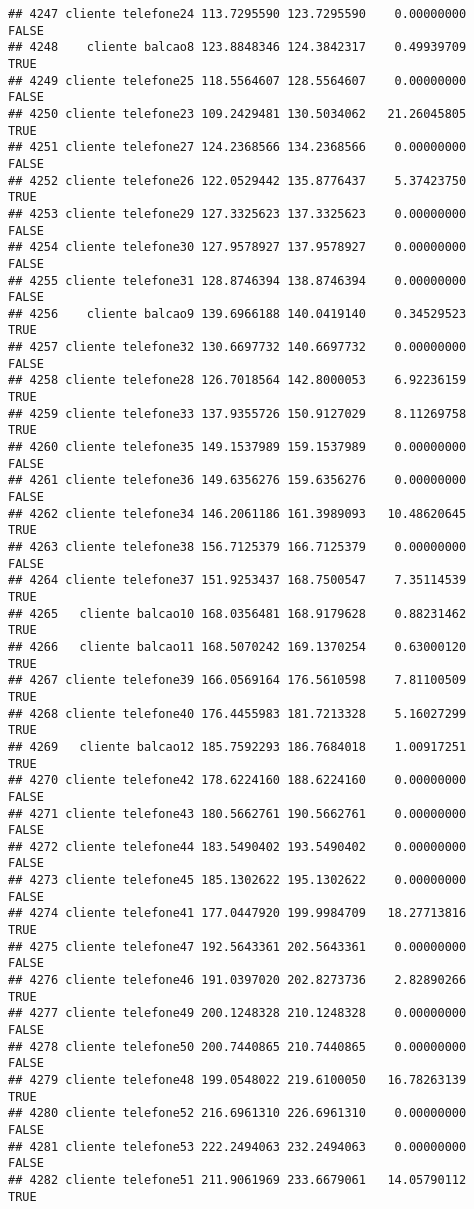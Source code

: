 \documentclass[
]{article}
\begin{document}
\begin{verbatim}
## 4247 cliente telefone24 113.7295590 123.7295590    0.00000000    FALSE
## 4248    cliente balcao8 123.8848346 124.3842317    0.49939709     TRUE
## 4249 cliente telefone25 118.5564607 128.5564607    0.00000000    FALSE
## 4250 cliente telefone23 109.2429481 130.5034062   21.26045805     TRUE
## 4251 cliente telefone27 124.2368566 134.2368566    0.00000000    FALSE
## 4252 cliente telefone26 122.0529442 135.8776437    5.37423750     TRUE
## 4253 cliente telefone29 127.3325623 137.3325623    0.00000000    FALSE
## 4254 cliente telefone30 127.9578927 137.9578927    0.00000000    FALSE
## 4255 cliente telefone31 128.8746394 138.8746394    0.00000000    FALSE
## 4256    cliente balcao9 139.6966188 140.0419140    0.34529523     TRUE
## 4257 cliente telefone32 130.6697732 140.6697732    0.00000000    FALSE
## 4258 cliente telefone28 126.7018564 142.8000053    6.92236159     TRUE
## 4259 cliente telefone33 137.9355726 150.9127029    8.11269758     TRUE
## 4260 cliente telefone35 149.1537989 159.1537989    0.00000000    FALSE
## 4261 cliente telefone36 149.6356276 159.6356276    0.00000000    FALSE
## 4262 cliente telefone34 146.2061186 161.3989093   10.48620645     TRUE
## 4263 cliente telefone38 156.7125379 166.7125379    0.00000000    FALSE
## 4264 cliente telefone37 151.9253437 168.7500547    7.35114539     TRUE
## 4265   cliente balcao10 168.0356481 168.9179628    0.88231462     TRUE
## 4266   cliente balcao11 168.5070242 169.1370254    0.63000120     TRUE
## 4267 cliente telefone39 166.0569164 176.5610598    7.81100509     TRUE
## 4268 cliente telefone40 176.4455983 181.7213328    5.16027299     TRUE
## 4269   cliente balcao12 185.7592293 186.7684018    1.00917251     TRUE
## 4270 cliente telefone42 178.6224160 188.6224160    0.00000000    FALSE
## 4271 cliente telefone43 180.5662761 190.5662761    0.00000000    FALSE
## 4272 cliente telefone44 183.5490402 193.5490402    0.00000000    FALSE
## 4273 cliente telefone45 185.1302622 195.1302622    0.00000000    FALSE
## 4274 cliente telefone41 177.0447920 199.9984709   18.27713816     TRUE
## 4275 cliente telefone47 192.5643361 202.5643361    0.00000000    FALSE
## 4276 cliente telefone46 191.0397020 202.8273736    2.82890266     TRUE
## 4277 cliente telefone49 200.1248328 210.1248328    0.00000000    FALSE
## 4278 cliente telefone50 200.7440865 210.7440865    0.00000000    FALSE
## 4279 cliente telefone48 199.0548022 219.6100050   16.78263139     TRUE
## 4280 cliente telefone52 216.6961310 226.6961310    0.00000000    FALSE
## 4281 cliente telefone53 222.2494063 232.2494063    0.00000000    FALSE
## 4282 cliente telefone51 211.9061969 233.6679061   14.05790112     TRUE

\end{verbatim}
\end{document}
